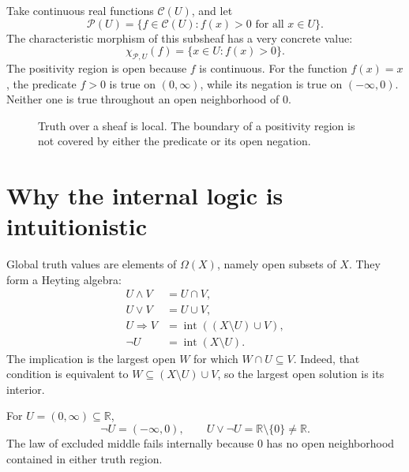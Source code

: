 Take continuous real functions \(\mathcal C(U)\), and let
\[
 \mathcal P(U)=
 \{f\in\mathcal C(U):f(x)>0\text{ for all }x\in U\}.
\]
The characteristic morphism of this subsheaf has a very concrete value:
\[
 \boxed{\chi_{\mathcal P,U}(f)
           =\{x\in U:f(x)>0\}.}
\]
The positivity region is open because \(f\) is continuous. For the function \(f(x)=x\), the predicate \(f>0\) is true on \((0,\infty)\), while its negation is true on \((-\infty,0)\). Neither one is true throughout an open neighborhood of \(0\).

\begin{figure}[H]
\centering
{}
\caption{Truth over a sheaf is local. The boundary of a positivity region is not covered by either the predicate or its open negation.}
\end{figure}

\section{Why the internal logic is intuitionistic}

Global truth values are elements of \(\Omega(X)\), namely open subsets of \(X\). They form a Heyting algebra:
\[
\begin{aligned}
 U\wedge V&=U\cap V,\\
 U\vee V&=U\cup V,\\
 U\Rightarrow V&=\operatorname{int}((X\setminus U)\cup V),\\
 \neg U&=\operatorname{int}(X\setminus U).
\end{aligned}
\]
The implication is the largest open \(W\) for which \(W\cap U\subseteq V\). Indeed, that condition is equivalent to \(W\subseteq(X\setminus U)\cup V\), so the largest open solution is its interior.

For \(U=(0,\infty)\subseteq\mathbb R\),
\[
 \neg U=(-\infty,0),\qquad
 U\vee\neg U=\mathbb R\setminus\{0\}\ne\mathbb R.
\]
The law of excluded middle fails internally because \(0\) has no open neighborhood contained in either truth region.

